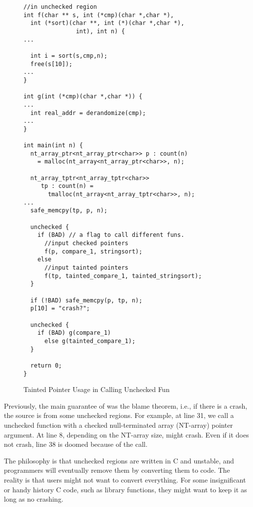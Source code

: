 \begin{figure}[t]
{\small
  \begin{lstlisting}[xleftmargin=4 mm]
//in unchecked region
int f(char ** s, int (*cmp)(char *,char *),
  int (*sort)(char **, int (*)(char *,char *),
               int), int n) {
...

  int i = sort(s,cmp,n);
  free(s[10]);
...
}

int g(int (*cmp)(char *,char *)) {
...
  int real_addr = derandomize(cmp);
...
}

int main(int n) {
  nt_array_ptr<nt_array_ptr<char>> p : count(n)
    = malloc(nt_array<nt_array_ptr<char>>, n);

  nt_array_tptr<nt_array_tptr<char>>
     tp : count(n) =
       tmalloc(nt_array<nt_array_tptr<char>>, n);
...
  safe_memcpy(tp, p, n);

  unchecked {
    if (BAD) // a flag to call different funs.
      //input checked pointers
      f(p, compare_1, stringsort); 
    else 
      //input tainted pointers
      f(tp, tainted_compare_1, tainted_stringsort);
  }

  if (!BAD) safe_memcpy(p, tp, n);
  p[10] = "crash?";
  
  unchecked {
    if (BAD) g(compare_1)
      else g(tainted_compare_1);
  }

  return 0;
}
  \end{lstlisting}
}
\caption{Tainted Pointer Usage in Calling Unchecked Fun}
\label{fig:checkedc-example-3}
\end{figure}


Previously, the main guarantee of \checkedc \cite{li22checkedc} was the blame theorem,
i.e., if there is a crash, the source is from some unchecked regions.
For example, at  line 31,
we call a unchecked function  with a checked null-terminated array (NT-array) pointer argument.
At line 8, depending on the NT-array size,  might crash.
Even if it does not crash, line 38 is doomed because of the  call.

The philosophy is that unchecked regions are written in C and unstable,
and programmers will eventually remove them by converting them to \checkedc code.
The reality is that users might not want to convert everything.
For some insignificant or handy history C code, such as library functions,
they might want to keep it as long as no crashing.

